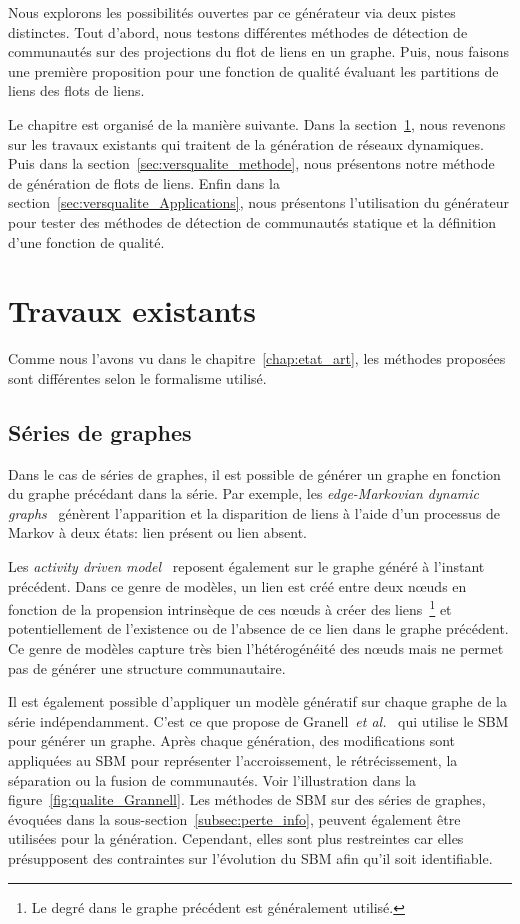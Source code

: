 \bigskip
Nous explorons les possibilités ouvertes par ce générateur via deux pistes distinctes.
Tout d'abord, nous testons différentes méthodes de détection de communautés sur des projections du flot de liens en un graphe.
Puis, nous faisons une première proposition pour une fonction de qualité évaluant les partitions de liens des flots de liens.

\bigskip

Le chapitre est organisé de la manière suivante.
Dans la section~\ref{sec:versqualite_existant}, nous revenons sur les travaux existants qui traitent de la génération de réseaux dynamiques.
Puis dans la section~\ref{sec:versqualite_methode}, nous présentons notre méthode de génération de flots de liens.
Enfin dans la section~\ref{sec:versqualite_Applications}, nous présentons l'utilisation du générateur pour tester des méthodes de détection de communautés statique et la définition d'une fonction de qualité.

\section{Travaux existants}
\label{sec:versqualite_existant}

Comme nous l'avons vu dans le chapitre~\ref{chap:etat_art}, les méthodes proposées sont différentes selon le formalisme utilisé.

\subsection{Séries de graphes}
Dans le cas de séries de graphes, il est possible de générer un graphe en fonction du graphe précédant dans la série.
Par exemple, les \emph{edge-Markovian dynamic graphs}~\cite{Clementi2008} génèrent l'apparition et la disparition de liens à l'aide d'un processus de Markov à deux états: lien présent ou lien absent.

Les \emph{activity driven model}~\cite{Perra2012,Laurent2015a,Moinet2015} reposent également sur le graphe généré à l'instant précédent.
Dans ce genre de modèles, un lien est créé entre deux n\oe uds en fonction de la propension intrinsèque de ces n\oe uds à créer des liens~\footnote{Le degré dans le graphe précédent est généralement utilisé.} et potentiellement de l'existence ou de l'absence de ce lien dans le graphe précédent.
Ce genre de modèles capture très bien l'hétérogénéité des n\oe uds mais ne permet pas de générer une structure communautaire.


Il est également possible d'appliquer un modèle génératif sur chaque graphe de la série indépendamment.
C'est ce que propose de Granell~\emph{et al.}~\cite{Granell2015a} qui utilise le SBM pour générer un graphe.
Après chaque génération, des modifications sont appliquées au SBM pour représenter l'accroissement, le rétrécissement, la séparation ou la fusion de communautés.
Voir l'illustration dans la figure~\ref{fig:qualite_Grannell}.
Les méthodes de SBM sur des séries de graphes, évoquées dans la sous-section~\ref{subsec:perte_info}, peuvent également être utilisées pour la génération.
Cependant, elles sont plus restreintes car elles présupposent des contraintes sur l'évolution du SBM afin qu'il soit identifiable.

